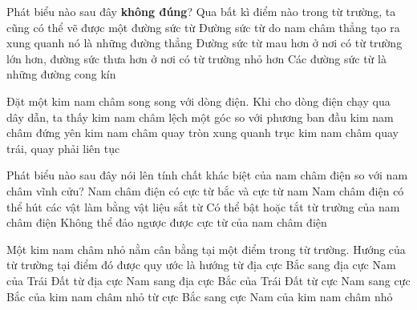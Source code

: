 \begin{ex}
	Phát biểu nào sau đây \textbf{không đúng}?	
	\choice
	{Qua bất kì điểm nào trong từ trường, ta cũng có thể vẽ được một đường sức từ}
	{\True Đường sức từ do nam châm thẳng tạo ra xung quanh nó là những đường thẳng}
	{Đường sức từ mau hơn ở nơi có từ trường lớn hơn, đường sức thưa hơn ở nơi có từ trường nhỏ hơn}
	{Các đường sức từ là những đường cong kín}
	\loigiai{}
\end{ex}
\begin{ex}
	Đặt một kim nam châm song song với dòng điện. Khi cho dòng điện chạy qua dây dẫn, ta thấy
	\choice
	{\True kim nam châm lệch một góc so với phương ban đầu}
	{kim nam châm đứng yên}
	{kim nam châm quay tròn xung quanh trục}
	{kim nam châm quay trái, quay phải liên tục}
	\loigiai{}
\end{ex}
\begin{ex}
	Phát biểu nào sau đây nói lên tính chất khác biệt của nam châm điện so với nam châm vĩnh cửu?
	\choice
	{Nam châm điện có cực từ bắc và cực từ nam}
	{Nam châm điện có thể hút các vật làm bằng vật liệu sắt từ}
	{\True Có thể bật hoặc tắt từ trường của nam châm điện}
	{Không thể đảo ngược được cực từ của nam châm điện}
	\loigiai{}
\end{ex}
\begin{ex}
	Một kim nam châm nhỏ nằm cân bằng tại một điểm trong từ trường. Hướng của từ trường tại điểm đó được quy ước là hướng	
	\choice
	{từ địa cực Bắc sang địa cực Nam của Trái Đất}
	{từ địa cực Nam sang địa cực Bắc của Trái Đất}
	{\True từ cực Nam sang cực Bắc của kim nam châm nhỏ}
	{từ cực Bắc sang cực Nam của kim nam châm nhỏ}
	\loigiai{}
\end{ex}


